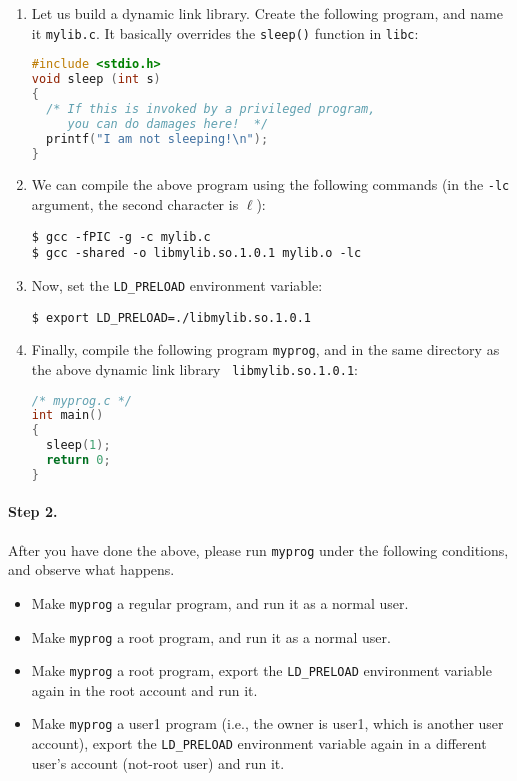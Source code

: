 \begin{enumerate}
  \item Let us build a dynamic link library. Create the following program,
  and name it {\tt mylib.c}. It basically overrides the {\tt sleep()} function
  in {\tt libc}:
\begin{lstlisting}[language=C]
#include <stdio.h>
void sleep (int s)
{
  /* If this is invoked by a privileged program,
     you can do damages here!  */
  printf("I am not sleeping!\n");
}
\end{lstlisting}

  \item We can compile the above program using the following commands (in the
  {\tt -lc} argument, the second character is $\ell$):
\begin{lstlisting}
$ gcc -fPIC -g -c mylib.c
$ gcc -shared -o libmylib.so.1.0.1 mylib.o -lc
\end{lstlisting}



  \item Now, set the {\tt LD\_PRELOAD} environment variable:
\begin{lstlisting}
$ export LD_PRELOAD=./libmylib.so.1.0.1
\end{lstlisting}

  \item Finally, compile the following program {\tt myprog}, and
  in the same directory as the above dynamic link library {\tt
  libmylib.so.1.0.1}:
\begin{lstlisting}[language=C]
/* myprog.c */
int main()
{
  sleep(1);
  return 0;
}
\end{lstlisting}
\end{enumerate}


\paragraph{Step 2.}
After you have done the above, please run {\tt myprog} under the following
conditions, and observe what happens.

  \begin{itemize}
  \item Make {\tt myprog} a regular program, and run it as a normal user.
  \item Make {\tt myprog} a \setuid root program, and run it as a normal user.
  \item Make {\tt myprog} a \setuid root program, export the {\tt LD\_PRELOAD}
  environment variable again in the root account and run it.

  \item Make {\tt myprog} a \setuid user1 program (i.e., the owner is user1, which
        is another user account), export the {\tt LD\_PRELOAD} environment variable
	again in a different user's account (not-root user) and run it.
  \end{itemize}


